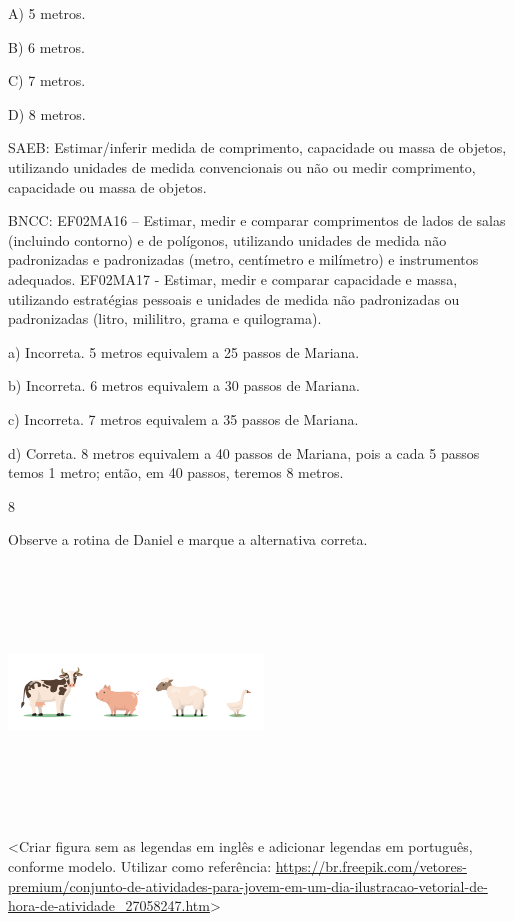 \begin{escolha}
\begin{escolha}
{{{{A) 5 metros.

B) 6 metros.

C) 7 metros.

D) 8 metros.

SAEB: Estimar/inferir medida de comprimento, capacidade ou massa
de objetos, utilizando unidades de medida convencionais ou não ou medir
comprimento, capacidade ou massa de objetos.

BNCC: EF02MA16 -- Estimar, medir e comparar comprimentos de lados de
salas (incluindo contorno) e de polígonos, utilizando unidades de medida
não padronizadas e padronizadas (metro, centímetro e milímetro) e
instrumentos adequados. EF02MA17 - Estimar, medir e comparar capacidade
e massa, utilizando estratégias pessoais e unidades de medida não
padronizadas ou padronizadas (litro, mililitro, grama e quilograma).

a) Incorreta. 5 metros equivalem a 25 passos de Mariana.

b) Incorreta. 6 metros equivalem a 30 passos de Mariana.

c) Incorreta. 7 metros equivalem a 35 passos de Mariana.

d) Correta. 8 metros equivalem a 40 passos de Mariana, pois a cada 5
passos temos 1 metro; então, em 40 passos, teremos 8 metros.

\num{8}

Observe a rotina de Daniel e marque a alternativa correta.

\includegraphics[width=2.66667in,height=2.65556in]{media/image116.png}

\textless{}Criar figura sem as legendas em inglês e adicionar legendas
em português, conforme modelo. Utilizar como referência:
\url{https://br.freepik.com/vetores-premium/conjunto-de-atividades-para-jovem-em-um-dia-ilustracao-vetorial-de-hora-de-atividade_27058247.htm}\textgreater{}

}}}}
\end{escolha}
\end{escolha}
